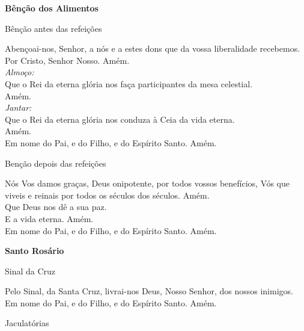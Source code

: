 \documentclass{book}
\begin{document}
\newpage
\begin{center}
    \textbf{Bênção dos Alimentos}
\end{center}
\begin{center}
    Bênção antes das refeições
\end{center}
\begin{flushleft}
    Abençoai-nos, Senhor, a nós e a estes dons que da vossa liberalidade recebemos. Por Cristo, Senhor Nosso. Amém. \\
    \hfill{} \break{}
    \textit{Almoço:} \\
    \VbarRed{} Que o Rei da eterna glória nos faça participantes da mesa celestial. \\
    \RbarRed{} Amém. \\
    \hfill{} \break{}
    \textit{Jantar:} \\
    \VbarRed{} Que o Rei da eterna glória nos conduza à Ceia da vida eterna. \\
    \RbarRed{} Amém. \\
    \hfill{} \break{}
    Em nome do Pai, \grecrossRed{} e do Filho, e do Espírito Santo. Amém.
\end{flushleft}
\begin{center}
    Benção depois das refeições
\end{center}
\begin{flushleft}
    Nós Vos damos graças, Deus onipotente, por todos vossos benefícios, Vós que viveis e reinais por todos os séculos dos séculos. Amém. \\
    \hfill{} \break{}
    \VbarRed{} Que Deus nos dê a sua paz. \\
    \RbarRed{} E a vida eterna. Amém. \\
    \hfill{} \break{}
    Em nome do Pai, \grecrossRed{} e do Filho, e do Espírito Santo. Amém.
\end{flushleft}
\newpage
\begin{center}
    \textbf{Santo Rosário}
\end{center}
\begin{center}
    Sinal da Cruz
\end{center}
\begin{flushleft}
    Pelo Sinal, \grecrossRed{} da Santa Cruz, livrai-nos Deus, \grecrossRed{} Nosso Senhor, dos nossos \grecrossRed{} inimigos. Em nome do Pai, \grecrossRed{} e do Filho, e do Espírito Santo. Amém.
\end{flushleft}
\begin{center}
    Jaculatórias
\end{center}
\end{document}
